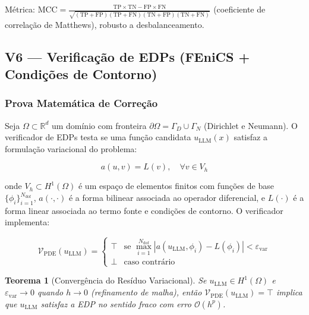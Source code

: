\documentclass[5p]{elsarticle}
\newtheorem{theorem}{Teorema}[section]
\theoremstyle{remark}
\begin{document}
Métrica: $\text{MCC} = \frac{\text{TP} \times \text{TN} - \text{FP} \times \text{FN}}{\sqrt{(\text{TP}+\text{FP})(\text{TP}+\text{FN})(\text{TN}+\text{FP})(\text{TN}+\text{FN})}}$ (coeficiente de correlação de Matthews), robusto a desbalanceamento.

\subsection{V6 --- Verificação de EDPs (FEniCS + Condições de Contorno)}

\subsubsection{Prova Matemática de Correção}

Seja $\Omega \subset \mathbb{R}^d$ um domínio com fronteira $\partial\Omega = \Gamma_D \cup \Gamma_N$ (Dirichlet e Neumann). O verificador de EDPs testa se uma função candidata $u_{\text{LLM}}(x)$ satisfaz a formulação variacional do problema:

\begin{equation}
a(u, v) = L(v), \quad \forall v \in V_h
\label{eq:c6_varform}
\end{equation}

onde $V_h \subset H^1(\Omega)$ é um espaço de elementos finitos com funções de base $\{\phi_i\}_{i=1}^{N_{\text{dof}}}$, $a(\cdot, \cdot)$ é a forma bilinear associada ao operador diferencial, e $L(\cdot)$ é a forma linear associada ao termo fonte e condições de contorno. O verificador implementa:

\begin{equation}
\mathcal{V}_{\text{PDE}}(u_{\text{LLM}}) = \begin{cases}
\top & \text{se } \max_{i=1}^{N_{\text{dof}}} |a(u_{\text{LLM}}, \phi_i) - L(\phi_i)| < \varepsilon_{\text{var}} \\
\bot & \text{caso contrário}
\end{cases}
\label{eq:c6_verify}
\end{equation}

\begin{theorem}[Convergência do Resíduo Variacional]
Se $u_{\text{LLM}} \in H^1(\Omega)$ e $\varepsilon_{\text{var}} \to 0$ quando $h \to 0$ (refinamento de malha), então $\mathcal{V}_{\text{PDE}}(u_{\text{LLM}}) = \top$ implica que $u_{\text{LLM}}$ satisfaz a EDP no sentido fraco com erro $\mathcal{O}(h^p)$.
\end{theorem}
\end{document}

